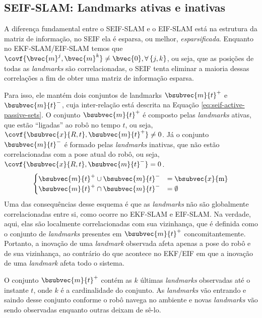 \subsection{SEIF-SLAM: Landmarks ativas e inativas}
\label{sec:seif-active-passive-landmarks}
A diferença fundamental entre o SEIF-SLAM e o EIF-SLAM está na estrutura da matriz de informação, no SEIF ela é esparsa, ou melhor, 
\emph{esparsificada}. Enquanto no EKF-SLAM/EIF-SLAM temos 
que $\covf{\bvec{m}^j, \bvec{m}^k} \neq \bvec{0}, 
\forall\, \{j,k\}$, ou seja, que as posições de todas as 
\textit{landmarks} são correlacionadas, o SEIF tenta eliminar a maioria 
dessas correlações a fim de obter uma matriz de informação esparsa.

Para isso, ele mantém dois conjuntos de landmarks $\bsubvec{m}{t}^+$ e $\bsubvec{m}{t}^-$, cuja inter-relação está descrita na Equação \ref{eq:seif-active-passive-sets}. O conjunto $\bsubvec{m}{t}^+$ é composto pelas \textit{landmarks} ativas, que estão
``ligadas'' ao robô no tempo $t$, ou seja, 
$\covf{\bsubvec{x}{R, t}, \bsubvec{m}{t}^+} \neq 0$. Já o conjunto 
$\bsubvec{m}{t}^-$ é 
formado pelas \textit{landmarks} inativas, que não estão correlacionadas com 
a pose atual do robô, ou seja, 
$\covf{\bsubvec{x}{R, t}, \bsubvec{m}{t}^-} = 0$.
\begin{equation}
\begin{cases}
  \bsubvec{m}{t}^+ \cup \bsubvec{m}{t}^- &= \bsubvec{x}{\mathrm{m}} \\
  \bsubvec{m}{t}^+ \cap \bsubvec{m}{t}^- &= \emptyset
\end{cases}
\label{eq:seif-active-passive-sets}
\end{equation}
Uma das consequências desse esquema é que as \textit{landmarks} não são 
globalmente correlacionadas entre si, como ocorre no EKF-SLAM e EIF-SLAM. Na 
verdade, aqui, elas são localmente correlacionadas com sua vizinhança, 
que é definida como o conjunto de \textit{landmarks} presentes em 
$\bsubvec{m}{t}^+$ concomitantemente. Portanto, a inovação de uma 
\textit{landmark} observada afeta apenas a pose do robô e de sua vizinhança, 
ao contrário do que acontece no EKF/EIF em que a inovação de uma 
\textit{landmark} afeta todo o sistema.

O conjunto $\bsubvec{m}{t}^+$ contém as $k$ últimas \textit{landmarks} 
observadas até o instante $t$, onde $k$ é a cardinalidade do conjunto. As 
\textit{landmarks} vão entrando e saindo desse conjunto conforme o robô 
navega no ambiente e novas \textit{landmarks} vão sendo observadas enquanto 
outras deixam de sê-lo.

